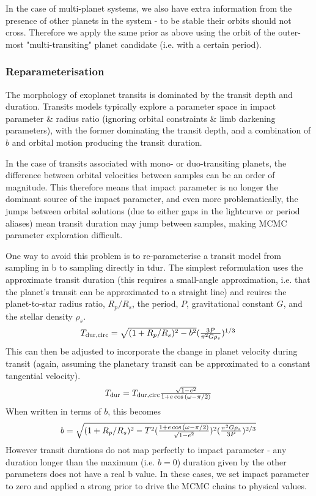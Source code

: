 \documentclass{article}
\begin{document}
In the case of multi-planet systems, we also have extra information from the presence of other planets in the system - to be stable their orbits should not cross.
Therefore we apply the same prior as above using the orbit of the outer-most "multi-transiting" planet candidate (i.e. with a certain period). 

\subsubsection{Reparameterisation}

The morphology of exoplanet transits is dominated by the transit depth and duration. 
Transits models typically explore a parameter space in impact parameter \& radius ratio  (ignoring orbital constraints \& limb darkening parameters), with the former dominating the transit depth, and a combination of $b$ and orbital motion producing the transit duration.

In the case of transits associated with mono- or duo-transiting planets, the difference between orbital velocities between samples can be an order of magnitude. 
This therefore means that impact parameter is no longer the dominant source of the impact parameter, and even more problematically, the jumps between orbital solutions (due to either gaps in the lightcurve or period aliases) mean transit duration may jump between samples, making MCMC parameter exploration difficult.

One way to avoid this problem is to re-parameterise a transit model from sampling in b to sampling directly in tdur.
The simplest reformulation uses the approximate transit duration (this requires a small-angle approximation, i.e. that the planet's transit can be approximated to a straight line) and reuires the planet-to-star radius ratio, $R_p/R_s$, the period, $P$, gravitational constant $G$, and the stellar density $\rho_s$.
\begin{equation}
$$ T_{\rm dur, circ} = \sqrt{(1+R_p/R_s)^2 - b^2} (\frac{3 P}{\pi^2 G \rho_s})^{1/3}  \; $$
\end{equation}
This can then be adjusted to incorporate the change in planet velocity during transit (again, assuming the planetary transit can be approximated to a constant tangential velocity).
\begin{equation}
$$ T_{\rm dur} = T_{\rm dur, circ} \frac{\sqrt{1-e^2}}{1+e\cos{(\omega - \pi/2)}} \;$$
\end{equation}
When written in terms of $b$, this becomes
\begin{equation}
$$ b = \sqrt{(1+R_p/R_s)^2 - T^2 (\frac{1+e\cos{(\omega - \pi/2)}}{\sqrt{1-e^2}})^2 (\frac{\pi^2G\rho_s}{3P})^{2/3}} \;$$
\end{equation}
However transit durations do not map perfectly to impact parameter - any duration longer than the maximum (i.e. $b=0$) duration given by the other parameters does not have a real b value.
In these cases, we set impact parameter to zero and applied a strong prior to drive the MCMC chains to physical values.
\end{document}
